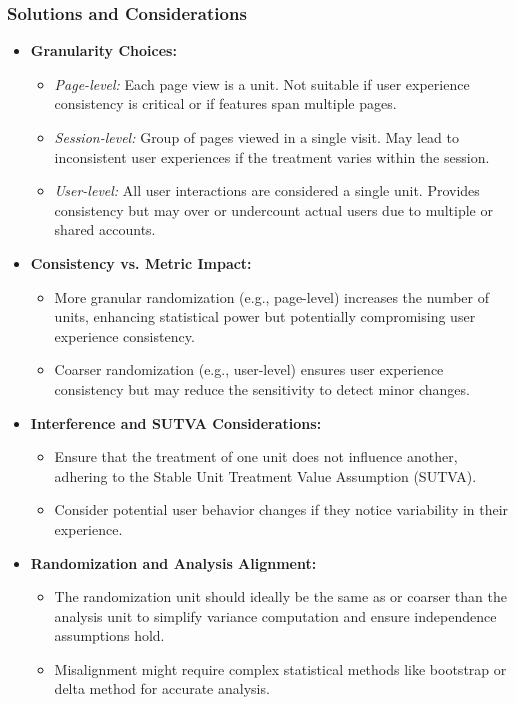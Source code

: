\documentclass{article}
\begin{document}
\subsubsection*{Solutions and Considerations}
\begin{itemize}
    \item \textbf{Granularity Choices:}
    \begin{itemize}
        \item \textit{Page-level:} Each page view is a unit. Not suitable if user experience consistency is critical or if features span multiple pages.
        \item \textit{Session-level:} Group of pages viewed in a single visit. May lead to inconsistent user experiences if the treatment varies within the session.
        \item \textit{User-level:} All user interactions are considered a single unit. Provides consistency but may over or undercount actual users due to multiple or shared accounts.
    \end{itemize}

    \item \textbf{Consistency vs. Metric Impact:}
    \begin{itemize}
        \item More granular randomization (e.g., page-level) increases the number of units, enhancing statistical power but potentially compromising user experience consistency.
        \item Coarser randomization (e.g., user-level) ensures user experience consistency but may reduce the sensitivity to detect minor changes.
    \end{itemize}

    \item \textbf{Interference and SUTVA Considerations:}
    \begin{itemize}
        \item Ensure that the treatment of one unit does not influence another, adhering to the Stable Unit Treatment Value Assumption (SUTVA).
        \item Consider potential user behavior changes if they notice variability in their experience.
    \end{itemize}

    \item \textbf{Randomization and Analysis Alignment:}
    \begin{itemize}
        \item The randomization unit should ideally be the same as or coarser than the analysis unit to simplify variance computation and ensure independence assumptions hold.
        \item Misalignment might require complex statistical methods like bootstrap or delta method for accurate analysis.
    \end{itemize}


\end{itemize}
\end{document}
